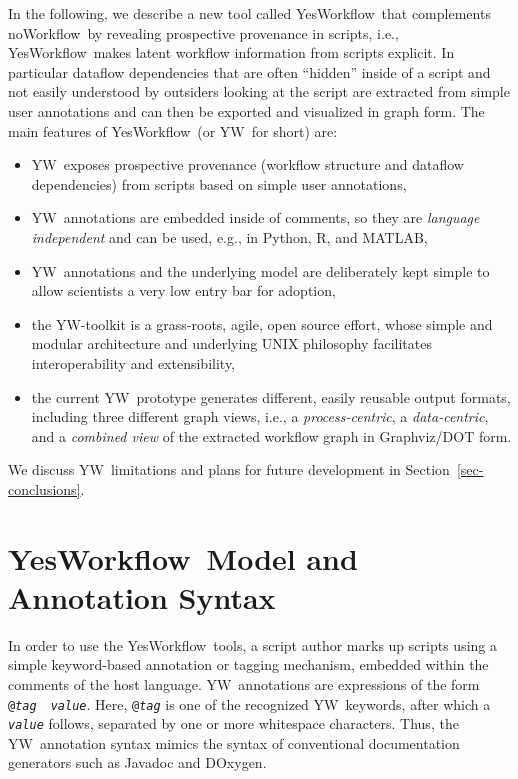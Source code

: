 \documentclass{article}
\newcommand{\NW}{\textsf{noWorkflow}}
\newcommand{\YW}{\textsf{YesWorkflow}}
\newcommand{\yw}{\textsf{YW}}
\newcommand{\YWT}{\textsf{YesWorkflow}}
\newcommand{\ywa}[1]{\texttt{#1}}
\newcommand{\R}{\textsf{R}}
\newcommand{\MATLAB}{\textsf{MATLAB}}
\begin{document}
In the following, we describe a new tool called \YW\  that
complements \NW\ by revealing prospective provenance in
scripts, i.e., \YW\ makes latent workflow information from scripts explicit. In
particular dataflow dependencies that are often ``hidden'' inside of a
script and not easily understood by outsiders looking at the script
are extracted from simple user annotations and can then be exported
and visualized in graph form. The main features of \YW\ (or \yw\ for short) are:
\begin{itemize}
\item \yw\ exposes prospective provenance (workflow structure and
  dataflow dependencies) from scripts based on simple user annotations,
\item \yw\ annotations are embedded inside of comments, so they
  are \emph{language independent} and can be used, e.g., in Python, \R,
  and \MATLAB,
\item \yw\ annotations and the underlying model are deliberately kept
  simple to allow scientists a very low entry bar for adoption,
\item the \yw-toolkit is a grass-roots, agile, open source effort, whose
 simple and modular architecture and underlying UNIX philosophy
 facilitates interoperability and extensibility,
\item the current \yw\ prototype generates different, easily reusable
  output formats, including three different graph views, i.e., a
  \emph{process-centric}, a \emph{data-centric}, and a \emph{combined
    view} of the extracted workflow graph in Graphviz/DOT form.
 \end{itemize}

 \noindent We discuss \yw\ limitations and plans for future
 development in Section~\ref{sec-conclusions}.


\section{\YWT\ Model and Annotation Syntax}\label{sec-ywmodel}

In order to use the \YW\ tools, a script author marks up scripts using
a simple keyword-based annotation or tagging mechanism, embedded
within the comments of the host language. \yw\ annotations are
expressions of the form
\ywa{@\emph{tag}}~\textvisiblespace~\ywa{\emph{value}}. Here,
\ywa{@\emph{tag}} is one of the recognized \yw\ keywords, after which a
\ywa{\emph{value}} follows, separated by one or more whitespace
characters. Thus, the \yw\ annotation syntax mimics the syntax of
conventional documentation generators such as Javadoc and DOxygen.
\end{document}
